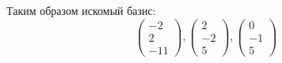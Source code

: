 Таким образом искомый базис:
\begin{equation}
    \begin{pmatrix}
        -2\\2\\-11
    \end{pmatrix},
    \begin{pmatrix}
        2\\-2\\5
    \end{pmatrix},
    \begin{pmatrix}
        0\\-1\\5
    \end{pmatrix}
\end{equation}

